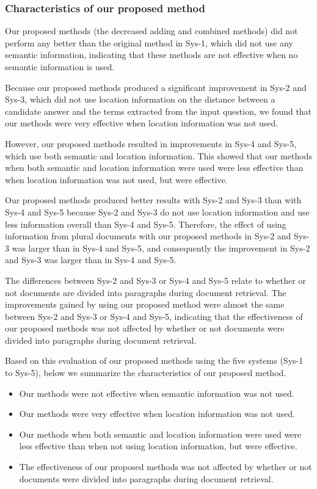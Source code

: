 \subsubsection{Characteristics of our proposed method}

Our proposed methods (the decreased adding and combined methods) 
did not perform any better than the original method 
in Sys-1, which did not use any semantic information, 
indicating that these methods are not effective 
when no semantic information is used. 

Because our proposed methods produced a significant improvement 
in Sys-2 and Sys-3, which did not use location information 
on the distance between a candidate answer 
and the terms extracted from the input question, 
we found that our methods were very effective 
when location information was not used.  

However, our proposed methods resulted in improvements 
in Sys-4 and Sys-5, which use both 
semantic and location information. 
This showed that 
our methods 
when both semantic and location information were used 
were less effective than when 
location information was not used, but were effective. 

Our proposed methods produced better results with Sys-2 and Sys-3 
than with Sys-4 and Sys-5 
because 
Sys-2 and Sys-3 do not use location information and 
use less information overall than Sys-4 and Sys-5.
Therefore, the effect of using information from plural documents 
with our proposed methods in Sys-2 and Sys-3 was larger than 
in Sys-4 and Sys-5, and consequently
the improvement in Sys-2 and Sys-3 
was larger than in Sys-4 and Sys-5. 

The differences between Sys-2 and Sys-3 or Sys-4 and Sys-5 
relate to whether or not documents are divided into paragraphs during document retrieval. 
The improvements gained by using our proposed method were 
almost the same between Sys-2 and Sys-3 or Sys-4 and Sys-5, 
indicating that 
the effectiveness of our proposed methods was not affected by 
whether or not documents were divided into paragraphs during document retrieval. 

Based on this evaluation of our proposed methods using the five systems (Sys-1 to Sys-5), 
below we summarize the characteristics of our proposed method. 
\begin{itemize}
\item 
  Our methods were not effective 
  when semantic information was not used. 

\item 
  Our methods were very effective 
  when location information was not used.  

\item 
  Our methods 
  when both semantic and location information were used 
  were less effective 
  than when not using location information, 
  but were effective. 

\item 
  The effectiveness of our proposed methods was not affected by 
  whether or not documents were divided into paragraphs during document retrieval. 
\end{itemize}

